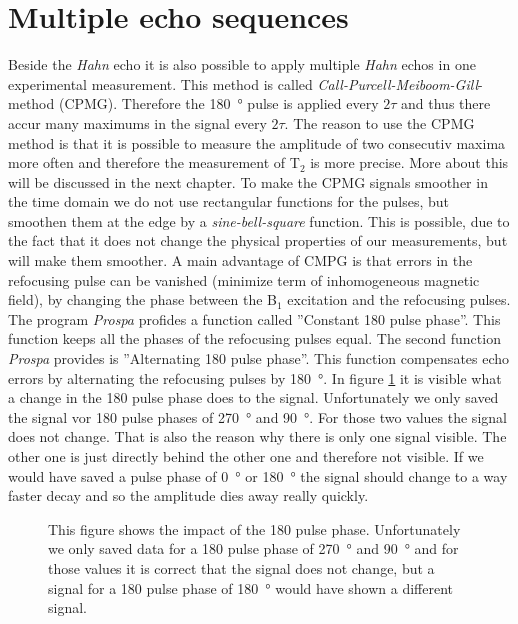 \section{Multiple echo sequences}
\label{sec:Multipleechosequences}
Beside the \textit{Hahn} echo it is also possible to apply multiple \textit{Hahn} echos in one experimental measurement. This method is called \textit{Call-Purcell-Meiboom-Gill}-method (CPMG). Therefore the \SI{180}{\degree} pulse is applied every $2\tau$ and thus there accur many maximums in the signal every $2\tau$. The reason to use the CPMG method is that it is possible to measure the amplitude of two consecutiv maxima more often and therefore the measurement of T$_2$ is more precise. More about this will be discussed in the next chapter.\newline
To make the CPMG signals smoother in the time domain we do not use rectangular functions for the pulses, but smoothen them at the edge by a \textit{sine-bell-square} function. This is possible, due to the fact that it does not change the physical properties of our measurements, but will make them smoother.\newline
A main advantage of CMPG is that errors in the refocusing pulse can be vanished (minimize term of inhomogeneous magnetic field), by changing the phase between the B$_1$ excitation and the refocusing pulses. The program \textit{Prospa} profides a function called ''Constant 180 pulse phase''. This function keeps all the phases of the refocusing pulses equal. The second function \textit{Prospa} provides is ''Alternating 180 pulse phase''. This function compensates echo errors by alternating the refocusing pulses by \SI{180}{\degree}. In figure \ref{fig:180pulsephasedegree} it is visible what a change in the 180 pulse phase does to the signal. Unfortunately we only saved the signal vor 180 pulse phases of \SI{270}{\degree} and \SI{90}{\degree}. For those two values the signal does not change. That is also the reason why there is only one signal visible. The other one is just directly behind the other one and therefore not visible. If we would have saved a pulse phase of \SI{0}{\degree} or \SI{180}{\degree} the signal should change to a way faster decay and so the amplitude dies away really quickly.

\begin{figure}[H]
    \centering
    
    \caption[This figure shows the impact of the 180 pulse phase.]{This figure shows the impact of the 180 pulse phase. Unfortunately we only saved data for a 180 pulse phase of \SI{270}{\degree} and \SI{90}{\degree} and for those values it is correct that the signal does not change, but a signal for a 180 pulse phase of \SI{180}{\degree} would have shown a different signal.}
    \label{fig:180pulsephasedegree}
\end{figure}

